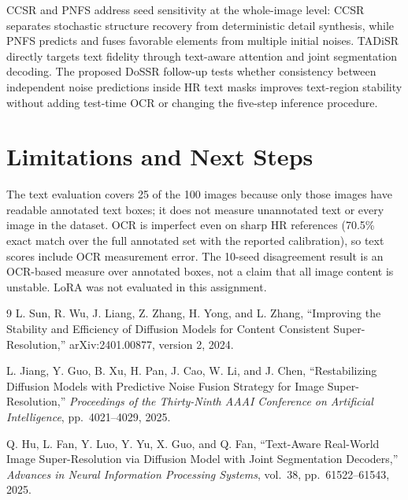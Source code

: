\documentclass[11pt]{article}
\begin{document}
CCSR and PNFS address seed sensitivity at the whole-image level: CCSR separates stochastic structure recovery from deterministic detail synthesis, while PNFS predicts and fuses favorable elements from multiple initial noises. TADiSR directly targets text fidelity through text-aware attention and joint segmentation decoding. The proposed DoSSR follow-up tests whether consistency between independent noise predictions inside HR text masks improves text-region stability without adding test-time OCR or changing the five-step inference procedure.

\section{Limitations and Next Steps}
The text evaluation covers 25 of the 100 images because only those images have readable annotated text boxes; it does not measure unannotated text or every image in the dataset. OCR is imperfect even on sharp HR references (70.5\% exact match over the full annotated set with the reported calibration), so text scores include OCR measurement error. The 10-seed disagreement result is an OCR-based measure over annotated boxes, not a claim that all image content is unstable. LoRA was not evaluated in this assignment.

\begin{thebibliography}{9}
L. Sun, R. Wu, J. Liang, Z. Zhang, H. Yong, and L. Zhang,
``Improving the Stability and Efficiency of Diffusion Models for Content Consistent Super-Resolution,''
arXiv:2401.00877, version 2, 2024.

L. Jiang, Y. Guo, B. Xu, H. Pan, J. Cao, W. Li, and J. Chen,
``Restabilizing Diffusion Models with Predictive Noise Fusion Strategy for Image Super-Resolution,''
\emph{Proceedings of the Thirty-Ninth AAAI Conference on Artificial Intelligence}, pp.~4021--4029, 2025.

Q. Hu, L. Fan, Y. Luo, Y. Yu, X. Guo, and Q. Fan,
``Text-Aware Real-World Image Super-Resolution via Diffusion Model with Joint Segmentation Decoders,''
\emph{Advances in Neural Information Processing Systems}, vol.~38, pp.~61522--61543, 2025.
\end{thebibliography}
\end{document}
